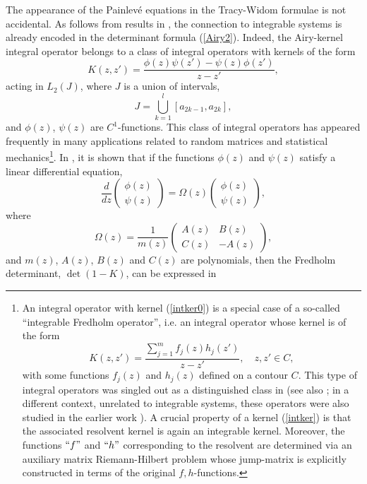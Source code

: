 \documentclass[11pt,letterpaper,reqno]{amsart}
\theoremstyle{definition}
\theoremstyle{remark}
\numberwithin{equation}{section}
\begin{document}
The appearance of the Painlev\'e equations in the Tracy-Widom formulae
is not accidental.  As  follows from  results in  \cite{80},
the   connection to  integrable systems is already
encoded in the determinant formula
(\ref{Airy2}). Indeed, the Airy-kernel integral operator belongs
to a  class of integral operators with kernels of the form
\begin{equation}\label{intker0}
K(z,z') = \frac{\phi(z)\psi(z') - \psi(z)\phi(z') }{z-z'},
\end{equation}
acting in $L_{2}(J)$, where $J$ is a union of intervals,
$$
J = \bigcup_{k=1}^{l}[a_{2k-1}, a_{2k}],
$$
and $\phi(z)$, $\psi(z)$ are $C^{1}$-functions. This class of  integral operators
has  appeared frequently in many applications related to random matrices
and statistical mechanics{\footnote{
An integral operator with kernel (\ref{intker0}) is a special case
of a so-called ``integrable Fredholm operator'', i.e. an integral operator whose
kernel is of the form
\begin{equation}\label{intker2}
K(z,z') = \frac{\sum_{j=1}^{m}f_j(z)h_{j}(z')}{z-z'}, \quad z, z' \in C,
\end{equation}
with some  functions $f_{j}(z)$ and $h_{j}(z)$ defined on a contour $C$.
This type of  integral operators  was singled out as a distinguished class
in \cite{iiks} (see also \cite{deift}; in a  different context,  unrelated to integrable
systems,  these operators were also studied  in the earlier work \cite{Sakh}).
 A crucial property of a kernel (\ref{intker}) is that the associated
resolvent kernel is again an integrable kernel. Moreover,
the functions  $``f"$ and $``h"$ corresponding to the resolvent are
determined via  an auxiliary matrix Riemann-Hilbert problem whose
jump-matrix is explicitly constructed in terms of the original
$f, h$-functions.}}.
In \cite{80}, it is shown that if the functions $\phi(z)$ and $\psi(z)$
satisfy a linear differential equation,
$$
\frac{d}{dz}\begin{pmatrix}\phi(z)\\ \psi(z)\end{pmatrix}
=\Omega(z)\begin{pmatrix}\phi(z)\\ \psi(z)\end{pmatrix},
$$
where
$$
\Omega(z) = \frac{1}{m(z)}\begin{pmatrix}A(z)&B(z)\\C(z)&-A(z)\end{pmatrix},
$$
and $m(z)$, $A(z)$, $B(z)$ and $C(z)$ are polynomials, then
the Fredholm determinant, $\det(1 - K)$, can be expressed in
\end{document}
